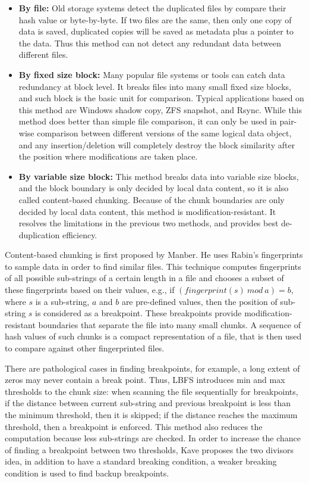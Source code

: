 \begin{itemize}
\item \textbf{By file:} Old storage systems detect the duplicated files by compare their hash value
or byte-by-byte. If two files are the same, then only one copy of data is saved, duplicated
copies will be saved as metadata plus a pointer to the data. Thus this method can not detect any redundant data
between different files.

\item \textbf{By fixed size block:} Many popular file systems or tools can catch data redundancy at block level.
It breaks files into many small fixed size blocks, and such block is the basic unit 
for comparison. Typical applications based on this method are Windows shadow copy, ZFS\cite{zfs} snapshot, and Rsync\cite{rsync}. 
While this method does better than simple file comparison, it can only be used in pair-wise comparison
between different versions of
the same logical data object, and any insertion/deletion will completely destroy the block similarity after the position
where modifications are taken place.

\item \textbf{By variable size block:} This method breaks data into variable size blocks, and the block boundary
is only decided by local data content, so it is also called content-based chunking. 
Because of the chunk boundaries are only decided by local data content,
this method is modification-resistant. It resolves the
limitations in the previous two methods, and provides
best de-duplication efficiency. 
\end{itemize} 

Content-based chunking is first proposed by Manber\cite{similar94}.
He uses Rabin's fingerprints\cite{rabin81, identify00} to sample
data in order to find similar files. This technique computes
fingerprints of all possible sub-strings of a certain
length in a file and chooses a subset of these fingerprints
based on their values,  e.g., if $(fingerprint(s)\ mod\ a) = b$, where
$s$ is a sub-string,
$a$ and $b$ are pre-defined values, then the position of sub-string $s$
is considered as a breakpoint. 
These breakpoints provide 
modification-resistant boundaries that separate the file
into many small chunks. A sequence of hash values of such chunks
is a compact representation of a file, that is then used to compare
against other fingerprinted files.

There are pathological cases in finding breakpoints, for example,
a long extent of zeros may never contain a break point. Thus, LBFS\cite{lbfs01}
introduces min and max thresholds to the chunk size: when scanning the file
sequentially for breakpoints, if the distance between current sub-string 
and previous breakpoint is less than the minimum threshold, then it is skipped;
if the distance reaches the maximum threshold, then a breakpoint
is enforced. This method also reduces the computation because less sub-strings
are checked. In order to increase the chance of finding a breakpoint between
two thresholds, Kave\cite{frame05}
proposes the two divisors idea, in addition to have a standard breaking condition,
a weaker breaking condition is used to find backup breakpoints.

